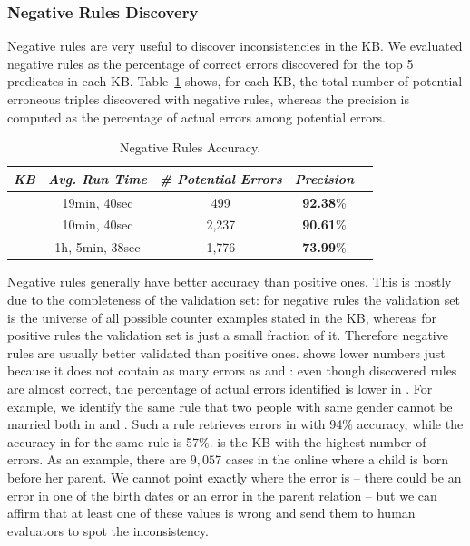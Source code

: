 \subsubsection{Negative Rules Discovery} Negative rules are very useful to discover inconsistencies in the KB. We evaluated negative rules as the percentage of correct errors discovered for the top 5 predicates in each KB. Table~\ref{tab:neg_rules_acc} shows, for each KB, the total number of potential erroneous triples discovered with negative rules, whereas the precision is computed as the percentage of actual errors among potential errors.

\begin{table}[b]
	\centering
	\caption{Negative Rules Accuracy.}
	\label{tab:neg_rules_acc}
	\begin{tabular}{|c|c|c|c|c|}
		\hline
		\hline
		{\it KB}&{\it Avg. Run Time}&{\it \# Potential Errors} & {\it Precision} \tabularnewline
		\hline
		\dbpedia & 19min, 40sec& 499 & \textbf{92.38}\%\tabularnewline
		\yago & 10min, 40sec & 2,237& \textbf{90.61}\%\tabularnewline
		\wikidata & 1h, 5min, 38sec & 1,776 & \textbf{73.99}\%\tabularnewline
		\hline
	\end{tabular}
\end{table}

Negative rules generally have better accuracy than positive ones. This is mostly due to the completeness of the validation set: for negative rules the validation set is the universe of all possible counter examples stated in the KB, whereas for positive rules the validation set is just a small fraction of it. Therefore negative rules are usually better validated than positive ones. \wikidata shows lower numbers just because it does not contain as many errors as \dbpedia and \yago: even though discovered rules are almost correct, the percentage of actual errors identified is lower in \wikidata. For example, we identify the same rule that two people with same gender cannot be married both in \yago and \wikidata. Such a rule retrieves errors in \yago with 94\% accuracy, while the accuracy in \wikidata for the same rule is 57\%. \yago is the KB with the highest number of errors. As an example, there are $9,057$ cases in the online \yago where a child is born before her parent. We cannot point exactly where the error is -- there could be an error in one of the birth dates or an error in the parent relation -- but we can affirm that at least one of these values is wrong and send them to human evaluators to spot the inconsistency.

